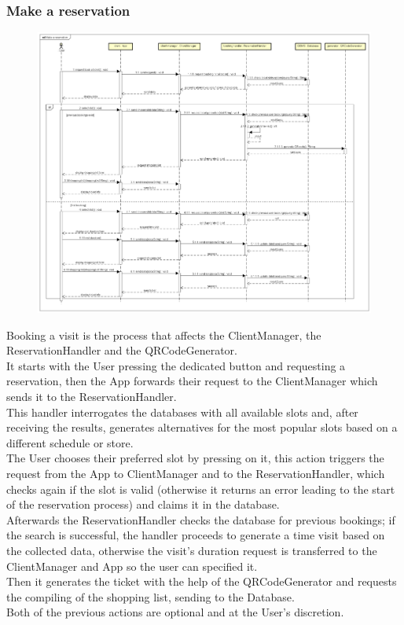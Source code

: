 \documentclass[table, 12pt]{article}
\begin{document}
\subsubsection{Make a reservation}
\begin{figure}[H]
    \begin{center}
        \includegraphics[width=\textwidth]{assets/Sequence-Diagram/make-a-reservation.png}
    \end{center}
\end{figure}
Booking a visit is the process that affects the ClientManager, the ReservationHandler and the QRCodeGenerator.\\
It starts with the User pressing the dedicated button and requesting a reservation, then the App forwards their request to the ClientManager which sends it to the ReservationHandler.\\
This handler interrogates the databases with all available slots and, after receiving the results, generates alternatives for the most popular slots based on a different schedule or store.\\
The User chooses their preferred slot by pressing on it, this action triggers the request from the App to ClientManager and to the ReservationHandler, which checks again if the slot is valid (otherwise it returns an error leading to the start of the reservation process) and claims it in the database.\\
Afterwards the ReservationHandler checks the database for previous bookings; if the search is successful, the handler proceeds to generate a time visit based on the collected data, otherwise the visit's duration request is transferred to the ClientManager and App so the user can specified it.\\
Then it generates the ticket with the help of the QRCodeGenerator and requests the compiling of the shopping list, sending to the Database.\\
Both of the previous actions are optional and at the User's discretion.
\end{document}
